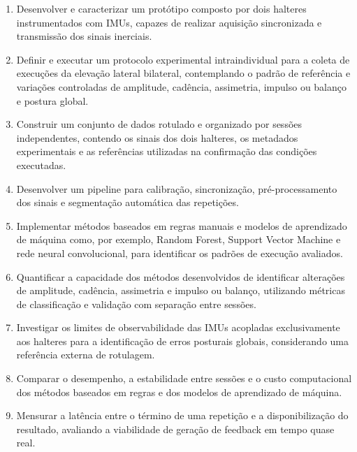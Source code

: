 \begin{enumerate}
    \item Desenvolver e caracterizar um protótipo composto por dois halteres instrumentados com IMUs, capazes de realizar aquisição sincronizada e transmissão dos sinais inerciais.
    
    \item Definir e executar um protocolo experimental intraindividual para a coleta de execuções da elevação lateral bilateral, contemplando o padrão de referência e variações controladas de amplitude, cadência, assimetria, impulso ou balanço e postura global.
    
    \item Construir um conjunto de dados rotulado e organizado por sessões independentes, contendo os sinais dos dois halteres, os metadados experimentais e as referências utilizadas na confirmação das condições executadas.
    
    \item Desenvolver um pipeline para calibração, sincronização, pré-processamento dos sinais e segmentação automática das repetições.
    
    \item Implementar métodos baseados em regras manuais e modelos de aprendizado de máquina como, por exemplo, Random Forest, Support Vector Machine e rede neural convolucional, para identificar os padrões de execução avaliados.
    
    \item Quantificar a capacidade dos métodos desenvolvidos de identificar alterações de amplitude, cadência, assimetria e impulso ou balanço, utilizando métricas de classificação e validação com separação entre sessões.
    
    \item Investigar os limites de observabilidade das IMUs acopladas exclusivamente aos halteres para a identificação de erros posturais globais, considerando uma referência externa de rotulagem.
    
    \item Comparar o desempenho, a estabilidade entre sessões e o custo computacional dos métodos baseados em regras e dos modelos de aprendizado de máquina.
    
    \item Mensurar a latência entre o término de uma repetição e a disponibilização do resultado, avaliando a viabilidade de geração de feedback em tempo quase real.

\end{enumerate}


